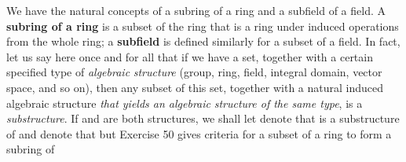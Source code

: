 \documentclass[11pt,oneside]{article}
\begin{document}
\begin{BookBody}
We have the natural concepts of a subring of a ring and a subfield of a field. A \textbf{subring of a ring} is a subset of the ring that is a ring under induced operations from the whole ring; a\textbf{ subfield} is defined similarly for a subset of a field. In fact, let us say here once and for all that if we have a set, together with a certain specified type of\textit{ algebraic} \textit{structure} (group, ring, field, integral domain, vector space, and so on), then any subset of this set, together with a natural induced algebraic structure\textit{ that yields an algebraic} \textit{structure of the same type}, is a\textit{ substructure}. If  and  are both structures, we shall let  denote that  is a substructure of  and  denote that  but  Exercise 50 gives criteria for a subset  of a ring  to form a subring of 

\end{BookBody}

\BookNarrativetrue
\end{document}
